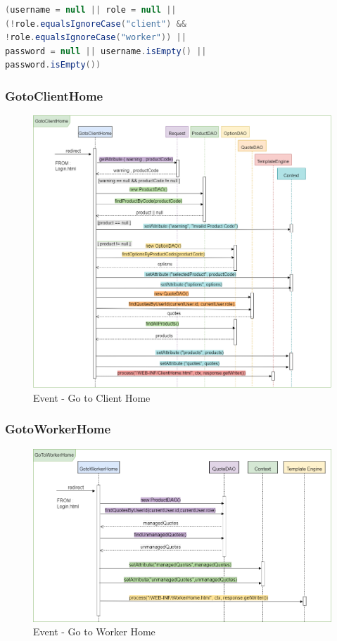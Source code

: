 \documentclass[a4paper, 12pt]{article}
\begin{document}
\begin{lstlisting}[language=java] 
(username = null || role = null ||
(!role.equalsIgnoreCase("client") && 
!role.equalsIgnoreCase("worker")) ||
password = null || username.isEmpty() ||
password.isEmpty())
\end{lstlisting}
	\subsubsection{GotoClientHome}
\begin{figure}[h!]
	\centering
	\includegraphics[width=1\textwidth]{PureHTML_images/GotoClientHome.png}
	\caption{Event - Go to Client Home}
	\label{figure:gotoclienthome_sd}
\end{figure}
\newpage
\subsubsection{GotoWorkerHome}
\begin{figure}[h!]
	\centering
	\includegraphics[width=1\textwidth]{PureHTML_images/GotoWorkerHome.png}
	\caption{Event - Go to Worker Home}
	\label{figure:gotoworkerhome_sd}
\end{figure}
\newpage
\end{document}
